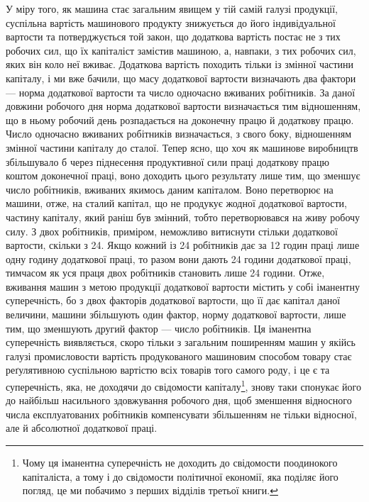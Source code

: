 У міру того, як машина стає загальним явищем у тій самій
галузі продукції, суспільна вартість машинового продукту знижується
до його індивідуальної вартости та потверджується той
закон, що додаткова вартість постає не з тих робочих сил, що їх
капіталіст замістив машиною, а, навпаки, з тих робочих сил,
яких він коло неї вживає. Додаткова вартість походить тільки
із змінної частини капіталу, і ми вже бачили, що масу додаткової
вартости визначають два фактори — норма додаткової вартости
та число одночасно вживаних робітників. За даної довжини робочого
дня норма додаткової вартости визначається тим відношенням,
що в ньому робочий день розпадається на доконечну працю
й додаткову працю. Число одночасно вживаних робітників визначається,
з свого боку, відношенням змінної частини капіталу до
сталої. Тепер ясно, що хоч як машинове виробництв збільшувало б
через піднесення продуктивної сили праці додаткову працю коштом
доконечної праці, воно доходить цього результату лише тим,
що зменшує число робітників, вживаних якимось даним капіталом.
Воно перетворює на машини, отже, на сталий капітал, що не продукує
жодної додаткової вартости, частину капіталу, який раніш
був змінний, тобто перетворювався на живу робочу силу. З двох
робітників, приміром, неможливо витиснути стільки додаткової
вартости, скільки з 24. Якщо кожний із 24 робітників дає за 12 годин
праці лише одну годину додаткової праці, то разом вони дають
24 години додаткової праці, тимчасом як уся праця двох робітників
становить лише 24 години. Отже, вживання машин з метою
продукції додаткової вартости містить у собі іманентну суперечність,
бо з двох факторів додаткової вартости, що її дає капітал
даної величини, машини збільшують один фактор, норму додаткової
вартости, лише тим, що зменшують другий фактор —
число робітників. Ця іманентна суперечність виявляється, скоро
тільки з загальним поширенням машин у якійсь галузі промисловости
вартість продукованого машиновим способом товару стає
реґулятивною суспільною вартістю всіх товарів того самого
роду, і це є та суперечність, яка, не доходячи до свідомости капіталу\footnote{
Чому ця іманентна суперечність не доходить до свідомости поодинокого
капіталіста, а тому і до свідомости політичної економії, яка поділяє
його погляд, це ми побачимо з перших відділів третьої книги.
},
знову таки спонукає його до найбільш насильного здовжування
робочого дня, щоб зменшення відносного числа експлуатованих
робітників компенсувати збільшенням не тільки
відносної, але й абсолютної додаткової праці.

